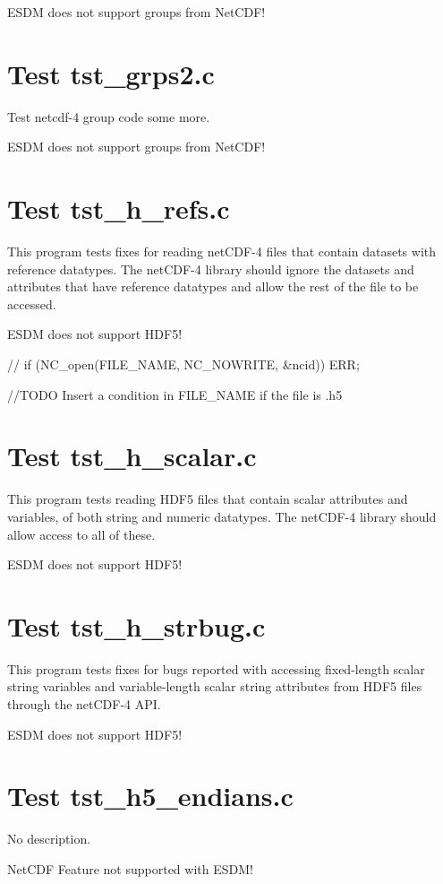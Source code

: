 ESDM does not support groups from NetCDF!

\section{Test tst\_grps2.c}

Test netcdf-4 group code some more.

ESDM does not support groups from NetCDF!

\section{Test tst\_h\_refs.c}

This program tests fixes for reading netCDF-4 files that contain datasets with reference datatypes.  The netCDF-4 library should ignore the datasets and attributes that have reference datatypes and allow the rest of the file to be accessed.

ESDM does not support HDF5!

// if (NC\_open(FILE\_NAME, NC\_NOWRITE, \&ncid)) ERR;

//TODO Insert a condition in FILE\_NAME if the file is .h5

\section{Test tst\_h\_scalar.c}

This program tests reading HDF5 files that contain scalar attributes and variables, of both string and numeric datatypes.  The netCDF-4 library should allow access to all of these.

ESDM does not support HDF5!

\section{Test tst\_h\_strbug.c}

This program tests fixes for bugs reported with accessing fixed-length scalar string variables and variable-length scalar string attributes from HDF5 files through the netCDF-4 API.

ESDM does not support HDF5!

\section{Test tst\_h5\_endians.c}

No description.

NetCDF Feature not supported with ESDM!

